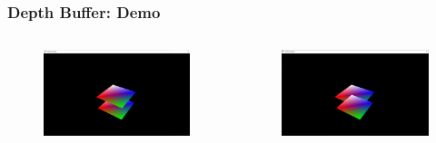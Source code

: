 \begin{frame}
\frametitle{Depth Buffer: Demo}

\begin{columns}


\begin{figure}[ht]
    \centering
    \includegraphics[scale=0.14]{images/SlidesDepthTesting/DepthTesting.png}
\end{figure}


\begin{figure}[ht]
    \centering
    \includegraphics[scale=0.14]{images/SlidesDepthTesting/NoDepthTesting.png}
\end{figure}

\end{columns}

\end{frame}

